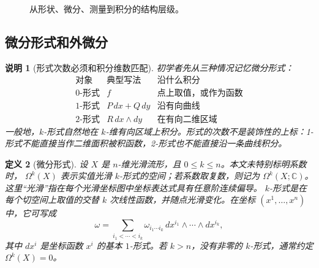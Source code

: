 \documentclass[UTF8,fontset=none,a4paper,11pt]{ctexart}
\theoremstyle{foundation-definition}
\newtheorem{definition}{定义}[section]
\theoremstyle{foundation-theorem}
\theoremstyle{foundation-proposition}
\theoremstyle{foundation-example}
\theoremstyle{foundation-remark}
\newtheorem{remark}[definition]{说明}
\theoremstyle{foundation-theorem}
\begin{document}
\begin{figure}[htbp]
\centering
{}
\caption{从形状、微分、测量到积分的结构层级。}
\label{fig:geometry-structure-ladder}
\end{figure}

\subsection{微分形式和外微分}

\begin{remark}[形式次数必须和积分维数匹配]
初学者先从三种情况记忆微分形式：
\[
\begin{array}{c|c|c}
\text{对象}&\text{典型写法}&\text{沿什么积分}\\
\hline
0\text{-形式}&f&\text{点上取值，或作为函数}\\
1\text{-形式}&P\,dx+Q\,dy&\text{沿有向曲线}\\
2\text{-形式}&R\,dx\wedge dy&\text{在有向二维区域}
\end{array}
\]
一般地，\(k\)-形式自然地在 \(k\)-维有向区域上积分。形式的次数不是装饰性的上标：1-形式不能直接当作二维面积被积函数，2-形式也不能直接沿一条曲线积分。
\end{remark}

\begin{definition}[微分形式]\label{def:form}
设 \(X\) 是 \(n\)-维光滑流形，且 \(0\leq k\leq n\)。本文未特别标明系数时，
\(\Omega^k(X)\) 表示实值光滑 \(k\)-形式的空间；若系数取复数，则记为
\(\Omega^k(X;\mathbb C)\)。这里“光滑”指在每个光滑坐标图中坐标表达式具有任意阶连续偏导。
\(k\)-形式是在每个切空间上取值的交替 \(k\) 次线性函数，并随点光滑变化。在坐标 \((x^1,\dots,x^n)\) 中，它可写成
\[
\omega=\sum_{i_1<\cdots<i_k}
\omega_{i_1\cdots i_k}\,dx^{i_1}\wedge\cdots\wedge dx^{i_k},
\]
其中 \(dx^i\) 是坐标函数 \(x^i\) 的基本 \(1\)-形式。若 \(k>n\)，没有非零的
\(k\)-形式，通常约定 \(\Omega^k(X)=0\)。
\end{definition}
\end{document}
